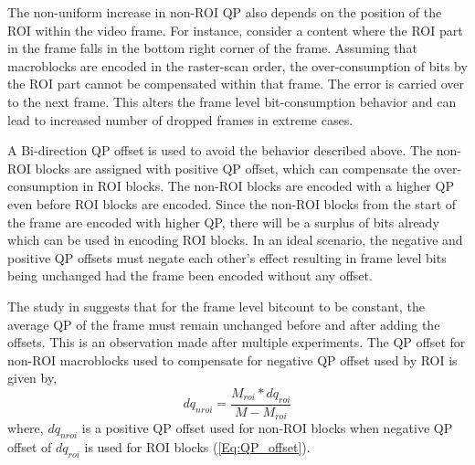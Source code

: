 \documentclass[11pt]{article} %
\begin{document}
The non-uniform increase in non-ROI QP also depends on the position of the ROI within the video frame. For instance, consider a content where the ROI part in the frame falls in the bottom right corner of the frame. Assuming that macroblocks are encoded in the raster-scan order, the over-consumption of bits by the ROI part cannot be compensated within that frame. The error is carried over to the next frame. This alters the frame level bit-consumption behavior and can lead to increased number of dropped frames in extreme cases. 

A Bi-direction QP offset is used to avoid the behavior described above. The non-ROI blocks are assigned with positive QP offset, which can compensate the over-consumption in ROI blocks. The non-ROI blocks are encoded with a higher QP even before ROI blocks are encoded. Since the non-ROI blocks from the start of the frame are encoded with higher QP, there will be a surplus of bits already which can be used in encoding ROI blocks. In an ideal scenario, the negative and positive QP offsets must negate each other's effect resulting in frame level bits being unchanged had the frame been encoded without any offset.

The study in \cite{ROI-Coding-paper} suggests that for the frame level bitcount to be constant, the average QP of the frame must remain unchanged before and after adding the offsets. This is an observation made after multiple experiments. The QP offset for non-ROI macroblocks used to compensate for negative QP offset used by ROI is given by,
\begin{equation}
	\label{Eq:QP_offset_double}
		dq_{nroi} = \frac{M_{roi} * dq_{roi}}{M - M_{roi}}
\end{equation}
where, $dq_{nroi}$ is a positive QP offset used for non-ROI blocks when negative QP offset of $dq_{roi}$ is used for ROI blocks (\ref{Eq:QP_offset}). 
\end{document}
